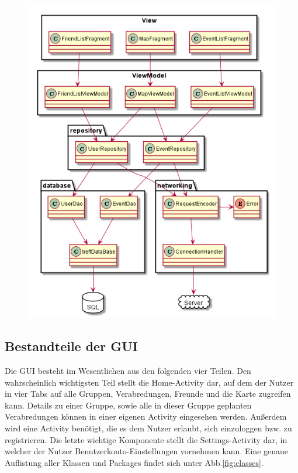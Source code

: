 \documentclass[parskip=full,11pt]{scrartcl}
\begin{document}
\begin{figure}
    \centering
    \includegraphics[width = \columnwidth / 3 * 2]{database.png}
    \label{fig:structure}
\end{figure}

%

\subsection{Bestandteile der GUI}

Die GUI besteht im Wesentlichen aus den folgenden vier Teilen. Den
wahrscheinlich wichtigsten Teil stellt die Home-Activity dar, auf dem der
Nutzer in vier Tabs auf alle Gruppen, Verabredungen, Freunde und die Karte zugreifen
kann. Details zu einer Gruppe, sowie alle in dieser Gruppe geplanten Verabredungen
können in einer eigenen Activity eingesehen werden. Außerdem wird eine Activity
benötigt, die es dem Nutzer erlaubt, sich einzuloggen bzw. zu registrieren.
Die letzte wichtige Komponente stellt die Settings-Activity dar, in welcher
der Nutzer Benutzerkonto-Einstellungen vornehmen kann. Eine genaue Auflistung
aller Klassen und Packages findet sich unter Abb.\ref{fig:classes}.
\end{document}
